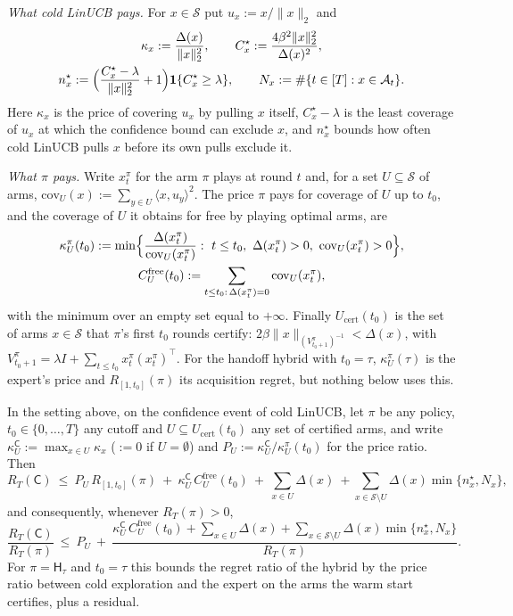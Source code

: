 \documentclass[anon]{alt2027} %
\newcommand{\ind}{\mathbf{1}}
\newcommand{\Cold}{\mathsf{C}}
\newcommand{\Hyb}{\mathsf{H}}
\begin{document}
\emph{What cold LinUCB pays.} For $x\in\mathcal S$ put $u_x:=x/\|x\|_2$ and
\begin{gather*}
\kappa_x:=\frac{\Delta(x)}{\|x\|_2^2},\qquad
C^\star_x:=\frac{4\beta^2\|x\|_2^2}{\Delta(x)^2},\\
n^\star_x:=\Bigl(\frac{C^\star_x-\lambda}{\|x\|_2^2}+1\Bigr)\ind\{C^\star_x\ge\lambda\},\qquad
N_x:=\#\{t\in[T]:x\in\mathcal A_t\}.
\end{gather*}
Here $\kappa_x$ is the price of covering $u_x$ by pulling $x$ itself,
$C^\star_x-\lambda$ is the least coverage of $u_x$ at which the confidence
bound can exclude $x$, and $n^\star_x$ bounds how often cold LinUCB pulls $x$
before its own pulls exclude it.

\emph{What $\pi$ pays.} Write $x^\pi_t$ for the arm $\pi$ plays at round $t$
and, for a set $U\subseteq\mathcal S$ of arms,
$\mathrm{cov}_U(x):=\sum_{y\in U}\langle x,u_y\rangle^2$. The price $\pi$ pays
for coverage of $U$ up to $t_0$, and the coverage of $U$ it obtains for free
by playing optimal arms, are
\begin{gather*}
\kappa^\pi_U(t_0):=\min\Bigl\{\frac{\Delta(x^\pi_t)}{\mathrm{cov}_U(x^\pi_t)}:
\ t\le t_0,\ \Delta(x^\pi_t)>0,\ \mathrm{cov}_U(x^\pi_t)>0\Bigr\},
\\
C^{\mathrm{free}}_U(t_0):=\sum_{t\le t_0:\,\Delta(x^\pi_t)=0}\mathrm{cov}_U(x^\pi_t),
\end{gather*}
with the minimum over an empty set equal to $+\infty$. Finally
$U_{\mathrm{cert}}(t_0)$ is the set of arms $x\in\mathcal S$ that $\pi$'s
first $t_0$ rounds certify: $2\beta\|x\|_{(V^\pi_{t_0+1})^{-1}}<\Delta(x)$, with
$V^\pi_{t_0+1}=\lambda I+\sum_{t\le t_0}x^\pi_t (x^\pi_t)^\top$. For the
handoff hybrid with $t_0=\tau$, $\kappa^\pi_U(\tau)$ is the expert's price and
$R_{[1,t_0]}(\pi)$ its acquisition regret, but nothing below uses this.

\begin{theorem}
\label{thm:general-price-full}
In the setting above, on the confidence event of cold LinUCB, let $\pi$ be
any policy, $t_0\in\{0,\dots,T\}$ any cutoff and $U\subseteq
U_{\mathrm{cert}}(t_0)$ any set of certified arms, and write
$\kappa^{\Cold}_U:=\max_{x\in U}\kappa_x$ ($:=0$ if $U=\emptyset$) and
$P_U:=\kappa^{\Cold}_U/\kappa^\pi_U(t_0)$ for the price ratio. Then
\[
R_T(\Cold)\ \le\ P_U\,R_{[1,t_0]}(\pi)\ +\ \kappa^{\Cold}_U\,C^{\mathrm{free}}_U(t_0)\ +\ \sum_{x\in U}\Delta(x)
\ +\sum_{x\in \mathcal S\setminus U}\Delta(x)\min\{n^\star_x,N_x\},
\]
and consequently, whenever $R_T(\pi)>0$,
\begin{equation}
\label{eq:general-price}
\frac{R_T(\Cold)}{R_T(\pi)}\ \le\ P_U\ +\
\frac{\kappa^{\Cold}_U\,C^{\mathrm{free}}_U(t_0)+\sum_{x\in U}\Delta(x)+\sum_{x\in \mathcal S\setminus U}\Delta(x)\min\{n^\star_x,N_x\}}{R_T(\pi)} .
\end{equation}
For $\pi=\Hyb_\tau$ and $t_0=\tau$ this bounds the regret ratio of the
hybrid by the price ratio between cold exploration and the expert on the
arms the warm start certifies, plus a residual.
\end{theorem}
\end{document}
